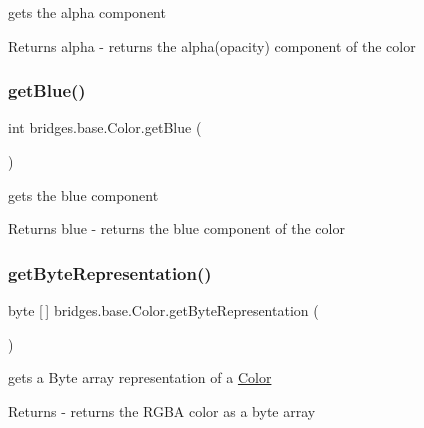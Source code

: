 gets the alpha component

\begin{DoxyReturn}{Returns}
alpha -\/ returns the alpha(opacity) component of the color 
\end{DoxyReturn}
\mbox{\label{classbridges_1_1base_1_1_color_ad4b82e1eb9ff59857d2868edd8d4ce65}} 
\subsubsection{\texorpdfstring{get\+Blue()}{getBlue()}}
{\footnotesize\ttfamily int bridges.\+base.\+Color.\+get\+Blue (\begin{DoxyParamCaption}{ }\end{DoxyParamCaption})}

gets the blue component

\begin{DoxyReturn}{Returns}
blue -\/ returns the blue component of the color 
\end{DoxyReturn}
\mbox{\label{classbridges_1_1base_1_1_color_a07215c888a6d17374a3d862ff30d5f93}} 
\subsubsection{\texorpdfstring{get\+Byte\+Representation()}{getByteRepresentation()}}
{\footnotesize\ttfamily byte \mbox{[}$\,$\mbox{]} bridges.\+base.\+Color.\+get\+Byte\+Representation (\begin{DoxyParamCaption}{ }\end{DoxyParamCaption})}

gets a Byte array representation of a \mbox{\hyperlink{classbridges_1_1base_1_1_color}{Color}}

\begin{DoxyReturn}{Returns}
-\/ returns the R\+G\+BA color as a byte array 
\end{DoxyReturn}
\mbox{\label{classbridges_1_1base_1_1_color_a8f3fdd23cf785704faa2e3701e25978f}} 
